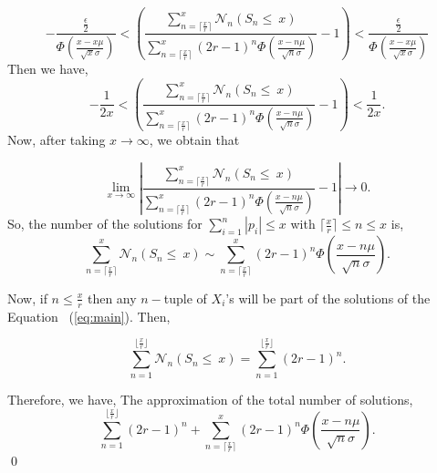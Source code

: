 \documentclass[11pt]{amsart}
\renewenvironment{proof}{{\bfseries Proof.}}{\qed}
\numberwithin{equation}{section}
\newcommand{\eqnref}[1]{~{\textrm(\ref{#1})}}
\numberwithin{equation}{section}
\begin{document}
\begin{proof}
	\[
	- \frac{\frac{\epsilon}{2}}{\Phi(\frac{x-x\mu}{\sqrt{x}\sigma})}< \left( \frac{\sum_{n=\lceil \frac{x}{r}\rceil}^{x}\mathcal{N}_{n}(S_n \leq ~x)}{\sum_{n=\lceil \frac{x}{r}\rceil}^{x}(2r-1)^{n}\Phi(\frac{x-n\mu}{\sqrt{n}\sigma})}-1\right)<  \frac{\frac{\epsilon}{2}}{\Phi(\frac{x-x\mu}{\sqrt{x}\sigma})}
	\]
	Then we have,
	\[
	- \frac{1}{2x}< \left( \frac{\sum_{n=\lceil \frac{x}{r}\rceil}^{x}\mathcal{N}_{n}(S_n \leq ~x)}{\sum_{n=\lceil \frac{x}{r}\rceil}^{x}(2r-1)^{n}\Phi(\frac{x-n\mu}{\sqrt{n}\sigma})}-1\right)<  \frac{1}{2x}.
	\] 
	Now, after taking $x\rightarrow\infty$, we obtain that

	\[
	\lim_{x\rightarrow\infty}	\left|  \frac{\sum_{n=\lceil \frac{x}{r}\rceil}^{x}\mathcal{N}_{n}(S_n \leq ~x)}{\sum_{n=\lceil \frac{x}{r}\rceil}^{x}(2r-1)^{n}\Phi(\frac{x-n\mu}{\sqrt{n}\sigma})}-1\right|\rightarrow 0.
	\] 
	So, the number of the solutions for $\sum_{i=1}^{n}|p_{i}|\leq x$ with $\lceil \frac{x}{r}\rceil\leq n\leq x$ is,
	\[ {\sum_{n=\lceil \frac{x}{r}\rceil}^{x}\mathcal{N}_{n}(S_n \leq ~x)}\sim{\sum_{n=\lceil \frac{x}{r}\rceil}^{x}(2r-1)^{n}\Phi\left(\frac{x-n\mu}{\sqrt{n}\sigma}\right)}. \]
	
Now, if $n\leq \frac{x}{r}$ then any $n-$tuple of $X_{i}$'s will be part of the solutions of the Equation \eqnref{eq:main}. Then,

 \[{\sum_{n=1}^{\lfloor \frac{x}{r}\rfloor}\mathcal{N}_{n}(S_n \leq ~x)}=\sum_{n=1}^{\lfloor \frac{x}{r}\rfloor}(2r-1)^{n}.\]
 
 Therefore, we have,
 The approximation of the total number of solutions,
 \[\sum_{n=1}^{\lfloor \frac{x}{r}\rfloor}(2r-1)^{n}+{\sum_{n=\lceil \frac{x}{r}\rceil}^{x}(2r-1)^{n}\Phi\left(\frac{x-n\mu}{\sqrt{n}\sigma}\right)} .\]
  \end{proof}
	
\end{document}
